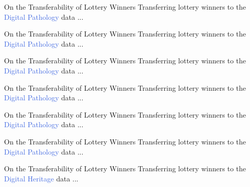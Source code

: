 \documentclass{beamer}
\begin{document}
\begin{frame}{On the Transferability of Lottery Winners}
	Transferring lottery winners to the \textcolor{RoyalBlue}{Digital Pathology} data ...
	
\end{frame}

\begin{frame}{On the Transferability of Lottery Winners}
	Transferring lottery winners to the \textcolor{RoyalBlue}{Digital Pathology} data ...
	
\end{frame}


\begin{frame}{On the Transferability of Lottery Winners}
		Transferring lottery winners to the \textcolor{RoyalBlue}{Digital Pathology} data ...

\end{frame}


\begin{frame}{On the Transferability of Lottery Winners}
		Transferring lottery winners to the \textcolor{RoyalBlue}{Digital Pathology} data ...

\end{frame}


\begin{frame}{On the Transferability of Lottery Winners}
		Transferring lottery winners to the \textcolor{RoyalBlue}{Digital Pathology} data ...

\end{frame}

\begin{frame}{On the Transferability of Lottery Winners}
	Transferring lottery winners to the \textcolor{RoyalBlue}{Digital Pathology} data ...
	
\end{frame}

\begin{frame}{On the Transferability of Lottery Winners}
	Transferring lottery winners to the \textcolor{RoyalBlue}{Digital Heritage} data ...
	
\end{frame}
\end{document}
